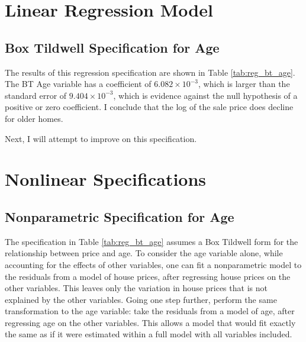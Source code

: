 \clearpage
\section{Linear Regression Model}

 

\subsection{Box Tildwell Specification for Age}

% 

% 

The results of this regression specification are shown in 
Table \ref{tab:reg_bt_age}. 
The BT Age variable has a coefficient of 
$6.082\times10^{-3}$,  
which is larger than the standard error of 
$9.404\times10^{-3}$, 
which is evidence against the null hypothesis of a positive or zero coefficient. 
I conclude that the log of the sale price does decline for older homes. 


Next, I will attempt to improve on this specification. 





\clearpage
\section{Nonlinear Specifications}


\subsection{Nonparametric Specification for Age}


The specification in 
Table \ref{tab:reg_bt_age}
assumes a Box Tildwell form for
the relationship between price and age. 
To consider the age variable alone, 
while accounting for the effects of other variables, 
one can fit a nonparametric model to the residuals 
from a model of house prices, 
after regressing house prices on the other variables. 
This leaves only the variation in house prices that is not explained by the other variables. 
Going one step further, perform the same transformation to the age variable:
take the residuals from a model of age, 
after regressing age on the other variables. 
This allows a model that would fit exactly the same as if it were estimated within a full model with all variables included. 

